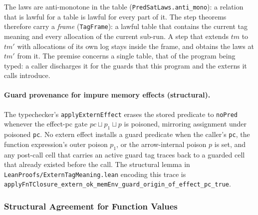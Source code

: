 \documentclass[12pt]{article}
\begin{document}
The laws are anti-monotone in the table (\texttt{PredSatLaws.anti\_mono}): a
relation that is lawful for a table is lawful for every part of it.  The step
theorems therefore carry a \emph{frame} (\texttt{TagFrame}): a lawful table
that contains the current tag meaning and every allocation of the current
sub-run.  A step that extends $tm$ to $tm'$ with allocations of its own log
stays inside the frame, and obtains the laws at $tm'$ from it.  The premise
concerns a single table, that of the program being typed: a caller discharges
it for the guards that this program and the externs it calls introduce.

\paragraph{Guard provenance for impure memory effects (structural).}
The typechecker's \texttt{applyExternEffect} erases the stored predicate to
\texttt{noPred} whenever the effect-pc gate \(\textit{pc} \sqcup p_1 \sqcup p\)
is poisoned, mirroring assignment under poisoned \texttt{pc}. No extern effect
installs a guard predicate when the caller's \texttt{pc}, the function
expression's outer poison \(p_1\), or the arrow-internal poison \(p\) is set,
and any post-call cell that carries an active guard tag traces back to a
guarded cell that already existed before the call. The structural lemma in
\texttt{LeanProofs/ExternTagMeaning.lean} encoding this trace is
\texttt{applyFnTClosure\_extern\_ok\_memEnv\_guard\_origin\_of\_effect\_pc\_true}.

\subsubsection*{Structural Agreement for Function Values}
\end{document}

